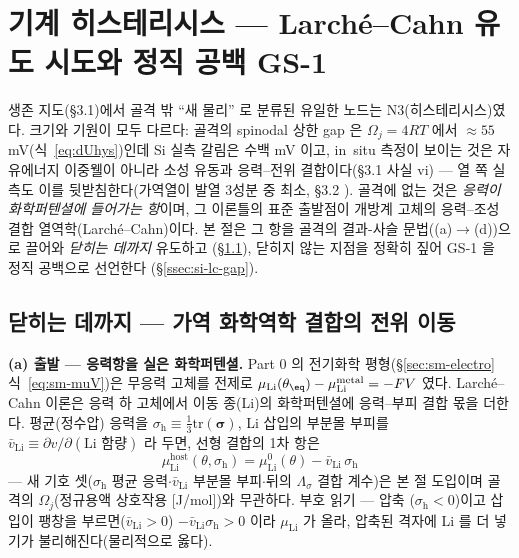 \section{기계 히스테리시스 --- Larché--Cahn 유도 시도와 정직 공백 GS-1}\label{sec:si-mech}
생존 지도(§3.1)에서 골격 밖 ``새 물리'' 로 분류된 유일한 노드는 N3(히스테리시스)였다. 크기와 기원이
모두 다르다: 골격의 spinodal 상한 gap 은 $\Omega_j{=}4RT$ 에서 $\approx55$ mV(식~\eqref{eq:dUhys})인데
Si 실측 갈림은 수백 mV 이고\cite{obrovac_chevrier2014}, in~situ 측정이 보이는 것은 자유에너지
이중웰이 아니라 소성 유동과 응력--전위 결합이다(§3.1 사실 vi) --- 열 쪽 실측도 이를 뒷받침한다(가역열이
발열 3성분 중 최소, §3.2 \cite{arnot_si2021}). 골격에 없는 것은 \emph{응력이 화학퍼텐셜에 들어가는
항}이며, 그 이론틀의 표준 출발점이 개방계 고체의 응력--조성 결합 열역학(Larché--Cahn)이다\cite{larchecahn1973}.
본 절은 그 항을 골격의 결과-사슬 문법((a)$\to$(d))으로 끌어와 \emph{닫히는 데까지} 유도하고
(\S\ref{ssec:si-lc-derive}), 닫히지 않는 지점을 정확히 짚어 GS-1 을 정직 공백으로 선언한다
(\S\ref{ssec:si-lc-gap}).

\subsection{닫히는 데까지 --- 가역 화학역학 결합의 전위 이동}\label{ssec:si-lc-derive}
\textbf{(a) 출발 --- 응력항을 실은 화학퍼텐셜.} Part 0 의 전기화학 평형(\S\ref{sec:sm-electro}
식~\eqref{eq:sm-muV})은 무응력 고체를 전제로 $\mu_\mathrm{Li}(\theta_\eq)-\mu_\mathrm{Li}^\mathrm{metal}
=-FV$ 였다. Larché--Cahn 이론은 응력 하 고체에서 이동 종(Li)의 화학퍼텐셜에 응력--부피 결합 몫을
더한다\cite{larchecahn1973}. 평균(정수압) 응력을 $\sigma_\mathrm{h}\equiv\tfrac13\mathrm{tr}(\bm\sigma)$,
Li 삽입의 부분몰 부피를 $\bar v_\mathrm{Li}\equiv\partial v/\partial(\text{Li 함량})$ 라 두면, 선형
결합의 1차 항은
\begin{equation}
\mu_\mathrm{Li}^\mathrm{host}(\theta,\sigma_\mathrm{h})
=\mu_\mathrm{Li}^{0}(\theta)-\bar v_\mathrm{Li}\,\sigma_\mathrm{h}
\label{eq:si-lcmu}
\end{equation}
--- 새 기호 셋($\sigma_\mathrm{h}$ 평균 응력$\cdot$$\bar v_\mathrm{Li}$ 부분몰 부피$\cdot$뒤의 $\Lambda_\sigma$
결합 계수)은 본 절 도입이며 골격의 $\Omega_j$(정규용액 상호작용 [J/mol])와 무관하다. 부호 읽기 --- 압축
($\sigma_\mathrm{h}<0$)이고 삽입이 팽창을 부르면($\bar v_\mathrm{Li}>0$) $-\bar v_\mathrm{Li}\sigma_\mathrm{h}>0$
이라 $\mu_\mathrm{Li}$ 가 올라, 압축된 격자에 Li 를 더 넣기가 불리해진다(물리적으로 옳다).


